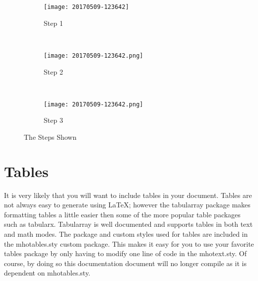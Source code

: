 \begin{figure}
    \begin{center}
    \begin{subfigure}[b]{0.3\textwidth}
        \texttt{[image: 20170509-123642]}
        \caption{Step 1}
        \label{fig:step1}
    \end{subfigure}
    ~   %
    \begin{subfigure}[b]{0.3\textwidth}
        \texttt{[image: 20170509-123642.png]}
        \caption{Step 2}
        \label{fig:step2}
    \end{subfigure}
    ~   %
    \begin{subfigure}[b]{0.3\textwidth}
        \texttt{[image: 20170509-123642.png]}
        \caption{Step 3}
        \label{fig:step3}
    \end{subfigure}
    \caption{The Steps Shown}\label{fig:threesteps}
    \end{center}
\end{figure}

\section{Tables}

It is very likely that you will want to include tables in your document.  
Tables are not always easy to generate using \LaTeX ; however the tabularray 
package makes formatting tables a little easier then some of the more 
popular table packages such as tabularx.  Tabularray is well documented and
supports tables in both text and math modes.  The package and custom styles 
used for tables are included in the mhotables.sty custom package.  This makes 
it easy for you to use your favorite tables package by only having to modify
one line of code in the mhotext.sty.  Of course, by doing so this documentation 
document will no longer compile as it is dependent on mhotables.sty.

\begin{dispListing}
\RequirePackage{tabularx}
\end{dispListing}

